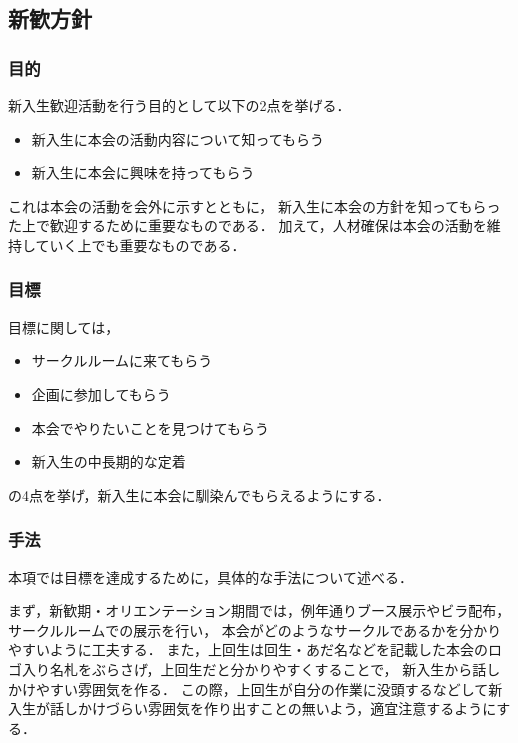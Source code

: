 \subsection*{新歓方針}


\subsubsection*{目的}
新入生歓迎活動を行う目的として以下の2点を挙げる．
\begin{itemize}
\item 新入生に本会の活動内容について知ってもらう
\item 新入生に本会に興味を持ってもらう
\end{itemize}
これは本会の活動を会外に示すとともに，
新入生に本会の方針を知ってもらった上で歓迎するために重要なものである．
加えて，人材確保は本会の活動を維持していく上でも重要なものである．

\subsubsection*{目標}
目標に関しては，
\begin{itemize}
\item サークルルームに来てもらう
\item 企画に参加してもらう
\item 本会でやりたいことを見つけてもらう
\item 新入生の中長期的な定着
\end{itemize}
の4点を挙げ，新入生に本会に馴染んでもらえるようにする．

\subsubsection*{手法}
本項では目標を達成するために，具体的な手法について述べる．

まず，新歓期・オリエンテーション期間では，例年通りブース展示やビラ配布，サークルルームでの展示を行い，
本会がどのようなサークルであるかを分かりやすいように工夫する．
また，上回生は回生・あだ名などを記載した本会のロゴ入り名札をぶらさげ，上回生だと分かりやすくすることで，
新入生から話しかけやすい雰囲気を作る．
この際，上回生が自分の作業に没頭するなどして新入生が話しかけづらい雰囲気を作り出すことの無いよう，適宜注意するようにする．

